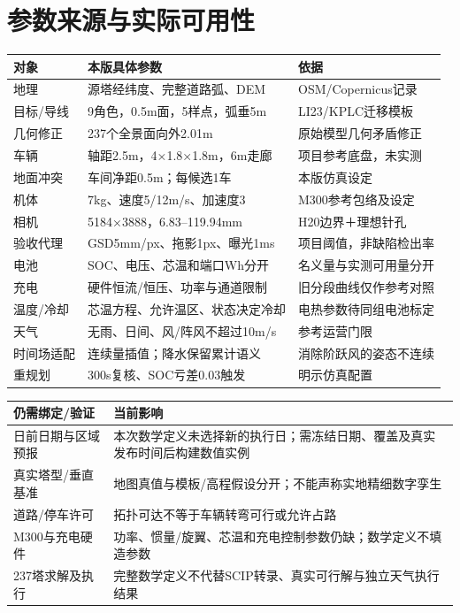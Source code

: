 \section{参数来源与实际可用性}
\begin{center}\small
\begin{tabular}{p{.20\linewidth}p{.45\linewidth}p{.25\linewidth}}\toprule
对象 & 本版具体参数 & 依据\\\midrule
地理 & 源塔经纬度、完整道路弧、DEM & OSM/Copernicus记录\\
目标/导线 & 9角色，0.5m面，5样点，弧垂5m & LI23/KPLC迁移模板\\
几何修正 & 237个全景面向外2.01m & 原始模型几何矛盾修正\\
车辆 & 轴距2.5m，4×1.8×1.8m，6m走廊 & 项目参考底盘，未实测\\
地面冲突 & 车间净距0.5m；每候选1车 & 本版仿真设定\\
机体 & 7kg、速度5/12m/s、加速度3 & M300参考包络及设定\\
相机 & 5184×3888，6.83--119.94mm & H20边界＋理想针孔\\
验收代理 & GSD5mm/px、拖影1px、曝光1ms & 项目阈值，非缺陷检出率\\
电池 & SOC、电压、芯温和端口Wh分开 & 名义量与实测可用量分开\\
充电 & 硬件恒流/恒压、功率与通道限制 & 旧分段曲线仅作参考对照\\
温度/冷却 & 芯温方程、允许温区、状态决定冷却 & 电热参数待同组电池标定\\
天气 & 无雨、日间、风/阵风不超过10m/s & 参考运营门限\\
时间场适配 & 连续量插值；降水保留累计语义 & 消除阶跃风的姿态不连续\\
重规划 & 300s复核、SOC亏差0.03触发 & 明示仿真配置\\\bottomrule
\end{tabular}\end{center}
\begin{center}\small
\begin{tabular}{p{.29\linewidth}p{.61\linewidth}}\toprule
仍需绑定/验证 & 当前影响\\\midrule
日前日期与区域预报 & 本次数学定义未选择新的执行日；需冻结日期、覆盖及真实发布时间后构建数值实例\\
真实塔型/垂直基准 & 地图真值与模板/高程假设分开；不能声称实地精细数字孪生\\
道路/停车许可 & 拓扑可达不等于车辆转弯可行或允许占路\\
M300与充电硬件 & 功率、惯量/旋翼、芯温和充电控制参数仍缺；数学定义不填造参数\\
237塔求解及执行 & 完整数学定义不代替SCIP转录、真实可行解与独立天气执行结果\\\bottomrule
\end{tabular}\end{center}
\clearpage


